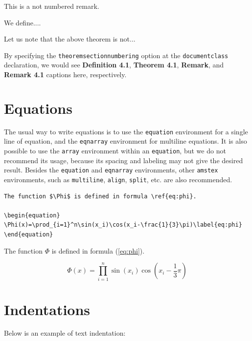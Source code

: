 \documentclass[notnumberedtheorems,withtitlethanks]{actacyb}
\begin{document}
\begin{nnremark}
This is a not numbered remark.
\end{nnremark}

\begin{definition}
We define....
\end{definition}

\begin{remark}
Let us note that the above theorem is not...
\end{remark}

By specifying the {\tt theoremsectionnumbering} option at the \verb|documentclass|
declaration, we would see \textbf{Definition 4.1}, \textbf{Theorem 4.1}, \textbf{Remark}, and \textbf{Remark 4.1} captions here, respectively.


\section{Equations}

The usual way to write equations is to use the \verb|equation| environment for a single line
of equation, and the \verb|eqnarray| environment for multiline equations.
It is also possible to use the \verb|array| environment within an \verb|equation|,
but we do not recommend its usage, because its spacing and labeling may not give the desired result.
Besides the \verb|equation| and \verb|eqnarray| environments,
other \verb|amstex| environments, such as \verb|multiline|, \verb|align|, \verb|split|, etc. 
are also recommended.

\begin{verbatim}
The function $\Phi$ is defined in formula \ref{eq:phi}.

\begin{equation}
\Phi(x)=\prod_{i=1}^n\sin(x_i)\cos(x_i-\frac{1}{3}\pi)\label{eq:phi}
\end{equation}
\end{verbatim}

The function $\Phi$ is defined in formula (\ref{eq:phi}).

\begin{equation}
\Phi(x)=\prod_{i=1}^n\sin(x_i)\cos(x_i-\frac{1}{3}\pi)\label{eq:phi}
\end{equation}


\section{Indentations}

Below is an example of text indentation:
\end{document}
